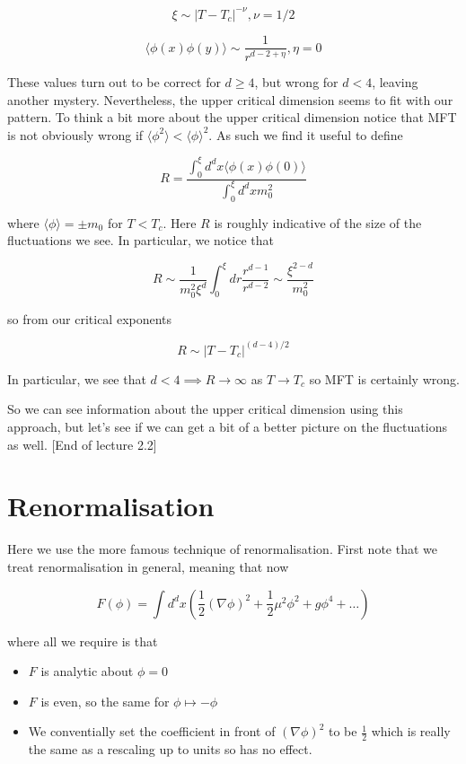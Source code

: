 \documentclass{article}
\theoremstyle{definition}
\begin{document}
$$ \xi \sim |T - T_c|^{-\nu}, \nu = 1/2 $$

$$ \langle \phi(x) \phi(y) \rangle \sim \frac{1}{r^{d -2 + \eta}}, \eta = 0 $$

These values turn out to be correct for $d \geq 4$, but wrong for $d < 4$,
leaving another mystery. Nevertheless, the upper critical dimension seems to fit
with our pattern. To think a bit more about the upper critical dimension notice
that MFT is not obviously wrong if $\langle \phi^2 \rangle < \langle \phi
\rangle^2$. As such we find it useful to define

$$ R = \frac{\int^\xi_0 d^d x \langle \phi(x) \phi(0) \rangle}{\int^\xi_0 d^d x
  m_0^2} $$

where $\langle \phi \rangle = \pm m_0$ for $T < T_c$. Here $R$ is roughly
indicative of the size of the fluctuations we see. In particular, we notice that

$$ R \sim \frac{1}{m_0^2 \xi^d} \int^\xi_0 dr \frac{r^{d - 1}}{r^{d - 2}} \sim
\frac{\xi^{2 - d}}{m_0^2} $$

so from our critical exponents

$$ R \sim |T - T_c|^{(d - 4) / 2} $$

In particular, we see that $d < 4 \implies R \to \infty$ as $T \to T_c$ so MFT
is certainly wrong.

So we can see information about the upper critical dimension using this
approach, but let's see if we can get a bit of a better picture on the
fluctuations as well. [End of lecture 2.2]

\section{Renormalisation}

Here we use the more famous technique of renormalisation. First note that we
treat renormalisation in general, meaning that now

$$ F(\phi) = \int d^d x \left( \frac{1}{2} (\nabla \phi)^2 + \frac{1}{2} \mu^2
  \phi^2 + g\phi^4 + \dots \right) $$

where all we require is that

\begin{itemize}
\item $F$ is analytic about $\phi = 0$
\item $F$ is even, so the same for $\phi \mapsto -\phi$
\item We conventially set the coefficient in front of $(\nabla \phi)^2$ to be
  $\frac{1}{2}$ which is really the same as a rescaling up to units so has no
  effect.
\end{itemize}
\end{document}
